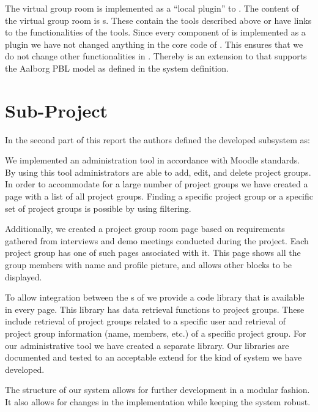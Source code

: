 
The virtual group room is implemented as a ``local plugin'' to \moodle{}.
The content of the virtual group room is \block{}s.
These contain the tools described above or have links to the functionalities of the tools.
Since every component of \system{} is implemented as a \moodle{} plugin we have not changed anything in the core code of \moodle{}.
This ensures that we do not change other functionalities in \moodle{}.
Thereby \system{} is an extension to \moodle{} that supports the Aalborg PBL model as defined in the system definition.

\section{Sub-Project}
\label{sec:subconclusion}

In the second part of this report the authors defined the developed subsystem as:



We implemented an administration tool in accordance with Moodle standards.
By using this tool administrators are able to add, edit, and delete project groups.
In order to accommodate for a large number of project groups we have created a page with a list of all project groups.
Finding a specific project group or a specific set of project groups is possible by using filtering.

Additionally, we created a project group room page based on requirements gathered from interviews and demo meetings conducted during the project.
Each project group has one of such pages associated with it.
This page shows all the group members with name and profile picture, and allows other \system{} blocks to be displayed.

To allow integration between the \subsystem{}s of \system{} we provide a code library that is available in every \moodle{} page.
This library has data retrieval functions to project groups.
These include retrieval of project groups related to a specific user and retrieval of project group information (name, members, etc.) of a specific project group.
For our administrative tool we have created a separate library.
Our libraries are documented and tested to an acceptable extend for the kind of system we have developed.

The structure of our system allows for further development in a modular fashion.
It also allows for changes in the implementation while keeping the system robust.











